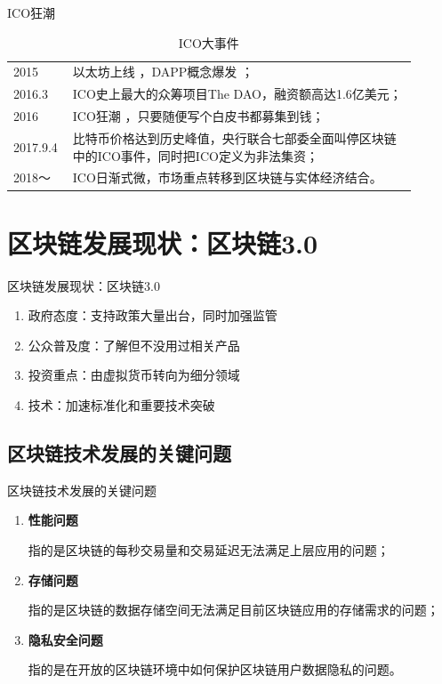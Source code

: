 \documentclass[11pt]{beamer}
\begin{document}
\begin{frame}{ICO狂潮}
\begin{minipage}[t]{0.6\linewidth}
\begin{table}[]
\begin{tabular}{@{}p{0.1\linewidth}p{0.8\linewidth}@{}}
				2015     & 以太坊上线 ，DAPP概念爆发 ；                                                               \\
				2016.3   & ICO史上最大的众筹项目The DAO，融资额高达1.6亿美元；                                        \\
				2016     & ICO狂潮 ，只要随便写个白皮书都募集到钱；                                                   \\
				2017.9.4 & 比特币价格达到历史峰值，央行联合七部委全面叫停区块链中的ICO事件，同时把ICO定义为非法集资； \\
				2018～   & ICO日渐式微，市场重点转移到区块链与实体经济结合。                                          \\
				\bottomrule
			\end{tabular}
			\caption{ICO大事件}
		\end{table}
	\end{minipage}%
\end{frame}

\section{区块链发展现状：区块链3.0}
\begin{frame}{区块链发展现状：区块链3.0}
	\begin{enumerate}
		\item 政府态度：支持政策大量出台，同时加强监管
		\item 公众普及度：了解但不没用过相关产品
		\item 投资重点：由虚拟货币转向为细分领域
		\item 技术：加速标准化和重要技术突破
	\end{enumerate}
\end{frame}

\subsection{区块链技术发展的关键问题}
\begin{frame}{区块链技术发展的关键问题}
	\begin{enumerate}
		\item \textbf{性能问题}

		      指的是区块链的每秒交易量和交易延迟无法满足上层应用的问题；

		\item \textbf{存储问题}

		      指的是区块链的数据存储空间无法满足目前区块链应用的存储需求的问题；

		\item \textbf{隐私安全问题}

		      指的是在开放的区块链环境中如何保护区块链用户数据隐私的问题。
	\end{enumerate}
\end{frame}
\end{document}
